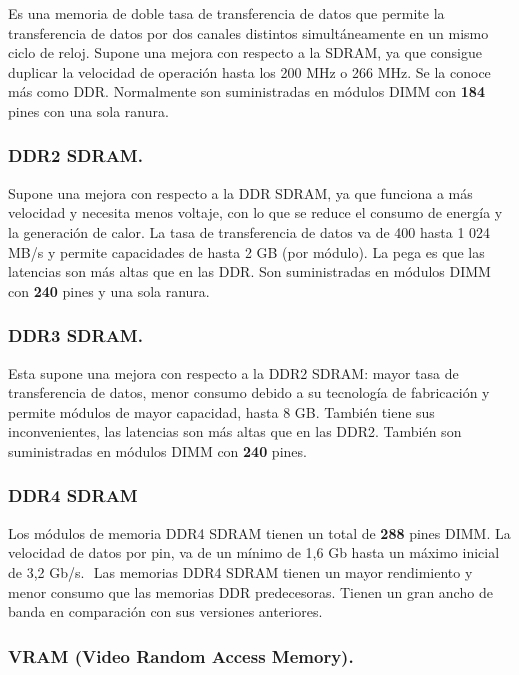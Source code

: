 \documentclass[11pt]{article}
\begin{document}
Es una memoria de doble tasa de transferencia
de datos que permite la transferencia de datos por dos canales
distintos simultáneamente en un mismo ciclo de reloj. Supone una
mejora con respecto a la SDRAM, ya que consigue duplicar la
velocidad de operación hasta los 200 MHz o 266 MHz. Se la
conoce más como DDR.
Normalmente son suministradas en módulos DIMM con \textbf{184} pines
con una sola ranura.

\subsubsection{DDR2 SDRAM.}
\label{sec:org87f84f2}

Supone una mejora con respecto a la DDR SDRAM,
ya que funciona a más velocidad y necesita menos voltaje, con
lo que se reduce el consumo de energía y la generación de calor.
La tasa de transferencia de datos va de 400 hasta 1 024 MB/s y
permite capacidades de hasta 2 GB (por módulo). La pega es que
las latencias son más altas que en las DDR. Son suministradas en
módulos DIMM con \textbf{240} pines y una sola ranura.

\subsubsection{DDR3 SDRAM.}
\label{sec:orgf989889}

Esta supone una mejora con respecto a la DDR2
SDRAM: mayor tasa de transferencia de datos, menor consumo
debido a su tecnología de fabricación y permite módulos de mayor
capacidad, hasta 8 GB. También tiene sus inconvenientes, las
latencias son más altas que en las DDR2. También son suministradas
en módulos DIMM con \textbf{240} pines.

\subsubsection{DDR4 SDRAM}
\label{sec:org5991cda}

Los módulos de memoria DDR4 SDRAM tienen un total de \textbf{288} pines DIMM. La
velocidad de datos por pin,  va de un mínimo de 1,6 Gb hasta un máximo inicial
de 3,2 Gb/s.
​
Las memorias DDR4 SDRAM tienen un mayor rendimiento y menor consumo que las
memorias DDR predecesoras. Tienen un gran ancho de banda en comparación con sus
versiones anteriores.

\subsubsection{VRAM (Video Random Access Memory).}
\label{sec:orgd5c1e2c}
\end{document}
